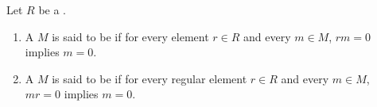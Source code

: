 \begin{definition} \label{definition:torsion_free_one_sided_module_over_a_ring}
Let $R$ be a .
\begin{enumerate}
    \item A  $M$ is said to be  if for every  element $r \in R$ and every $m \in M$, $rm = 0$ implies $m = 0$.

    \item A  $M$ is said to be  if for every regular element $r \in R$ and every $m \in M$, $mr = 0$ implies $m = 0$.
\end{enumerate}
\end{definition}